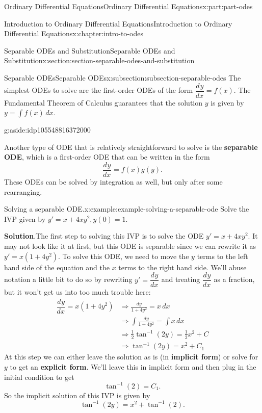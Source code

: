 \documentclass[twoside,10pt,]{book}
\newcommand{\blocktitlefont}{\relax}
\newcommand{\terminology}[1]{\textbf{#1}}
\numberwithin{equation}{part}
\providecommand{\dv}[3][]{\dfrac{d^{#1} #2}{d #3^{#1}}}
\begin{document}
\begin{partptx}{Ordinary Differential Equations}{}{Ordinary Differential Equations}{}{}{x:part:part-odes}
\begin{chapterptx}{Introduction to Ordinary Differential Equations}{}{Introduction to Ordinary Differential Equations}{}{}{x:chapter:intro-to-odes}
\begin{sectionptx}{Separable ODEs and Substitution}{}{Separable ODEs and Substitution}{}{}{x:section:section-separable-odes-and-substitution}
\begin{subsectionptx}{Separable ODEs}{}{Separable ODEs}{}{}{x:subsection:subsection-separable-odes}
The simplest ODEs to solve are the first-order ODEs of the form \(\dv{y}{x} = f(x)\). The Fundamental Theorem of Calculus guarantees that the solution \(y\) is given by \(y = \int f(x)\,dx\).%
\begin{aside}{}{g:aside:idp105548816372000}%
\end{aside}
Another type of ODE that is relatively straightforward to solve is the \terminology{separable ODE}, which is a first-order ODE that can be written in the form%
%
\begin{equation*}
\dv{y}{x} = f(x)g(y).
\end{equation*}
These ODEs can be solved by integration as well, but only after some rearranging.%
\begin{example}{Solving a separable ODE.}{x:example:example-solving-a-separable-ode}%
Solve the IVP given by \(y' = x+4xy^{2}, y(0)=1\).%
\par\smallskip%
\noindent\textbf{\blocktitlefont Solution}.\hypertarget{g:solution:idp105548816342176}{}\quad{}The first step to solving this IVP is to solve the ODE \(y' = x+4xy^{2}\). It may not look like it at first, but this ODE is separable since we can rewrite it as \(y' = x(1+4y^{2})\). To solve this ODE, we need to move the \(y\) terms to the left hand side of the equation and the \(x\) terms to the right hand side. We'll abuse notation a little bit to do so by rewriting \(y' = \dv{y}{x}\) and treating \(\dv{y}{x}\) as a fraction, but it won't get us into too much trouble here:%
%
\begin{align*}
\dv{y}{x} = x(1+4y^{2}) &\Rightarrow \frac{dy}{1+4y^{2}} = x\,dx \\
&\Rightarrow \int\frac{dy}{1+4y^{2}}  = \int x\,dx \\
&\Rightarrow \frac{1}{2}\tan^{-1}(2y)  = \frac{1}{2}x^{2}+C \\
&\Rightarrow \tan^{-1}(2y)  = x^{2}+C_{1} 
\end{align*}
At this step we can either leave the solution as is (in \terminology{implicit form}) or solve for \(y\) to get an \terminology{explicit form}. We'll leave this in implicit form and then plug in the initial condition to get%
\begin{equation*}
\tan^{-1}(2) = C_{1}.
\end{equation*}
So the implicit solution of this IVP is given by%
\begin{equation*}
\tan^{-1}(2y) = x^{2}+\tan^{-1}(2).

\end{equation*}
\end{example}
\end{subsectionptx}
\end{sectionptx}
\end{chapterptx}
\end{partptx}
\end{document}
